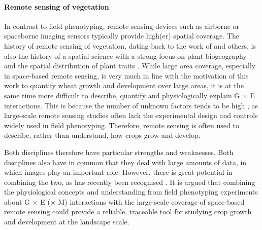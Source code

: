 \paragraph{Remote sensing of vegetation}
In contrast to field phenotyping, remote sensing devices such as airborne or spaceborne imaging sensors typically provide high(er) spatial coverage. The history of remote sensing of vegetation, dating back to the work of \cite{rouse_monitoring_1974} and others, is also the history of a spatial science \citep{goodchild_geographical_1992} with a strong focus on plant biogeography and the spatial distribution of plant traits \citep{millington_gis_2001}. While large area coverage, especially in space-based remote sensing, is very much in line with the motivation of this work to quantify wheat growth and development over large areas, it is at the same time more difficult to describe, quantify and physiologically explain G $\times$ E interactions. This is because the number of unknown factors tends to be high \citep{helman_land_2018}, as large-scale remote sensing studies often lack the experimental design and controls widely used in field phenotyping. Therefore, remote sensing is often used to describe, rather than understand, how crops grow and develop.
\bigskip

Both disciplines therefore have particular strengths and weaknesses. Both disciplines also have in common that they deal with large amounts of data, in which images play an important role. However, there is great potential in combining the two, as has recently been recognised \citep{machwitz_bridging_2021, walter_advances_2022}. It is argued that combining the physiological concepts and understanding from field phenotyping experiments about G $\times$ E ($\times$ M) interactions with the large-scale coverage of space-based remote sensing could provide a reliable, traceable tool for studying crop growth and development at the landscape scale.

